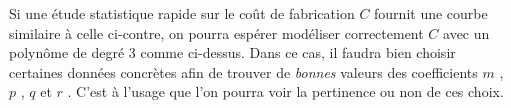 \vspace{-1.5em}

\begin{figure} 
	\begin{center}
	\end{center}
	\vspace{-2em}
\end{figure} 

Si une étude statistique rapide sur le coût de fabrication $C$ fournit une courbe similaire à celle ci-contre, on pourra espérer modéliser correctement $C$ avec un polynôme de degré 3 comme ci-dessus. Dans ce cas, il faudra bien choisir  certaines données concrètes afin de trouver de \emph{\og bonnes \fg} valeurs des coefficients $m$ , $p$ , $q$ et $r$ . C'est à l'usage que l'on pourra voir la pertinence ou non de ces choix.


